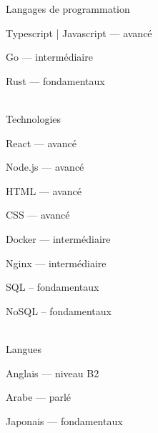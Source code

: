 

\begin{cvskills}

  \cvskill
    {Langages de programmation} %
    {
      \begin{cvitems} %
        \item {Typescript | Javascript — avancé}
        \item {Go — intermédiaire}
        \item {Rust — fondamentaux}
      \end{cvitems}
    }
\\

  \cvskill
    {Technologies} %
    {
      \begin{cvitems} %
        \item {React — avancé}
        \item {Node.js — avancé}
        \item {HTML — avancé}
        \item {CSS — avancé}
        \item {Docker — intermédiaire}
        \item {Nginx — intermédiaire}
        \item {SQL – fondamentaux}
        \item {NoSQL – fondamentaux}
      \end{cvitems}
    }
\\

  \cvskill
    {Langues} %
    {
      \begin{cvitems} %
        \item {Anglais — niveau B2}
        \item {Arabe — parlé}
        \item {Japonais — fondamentaux}
      \end{cvitems}
    }

\end{cvskills}
